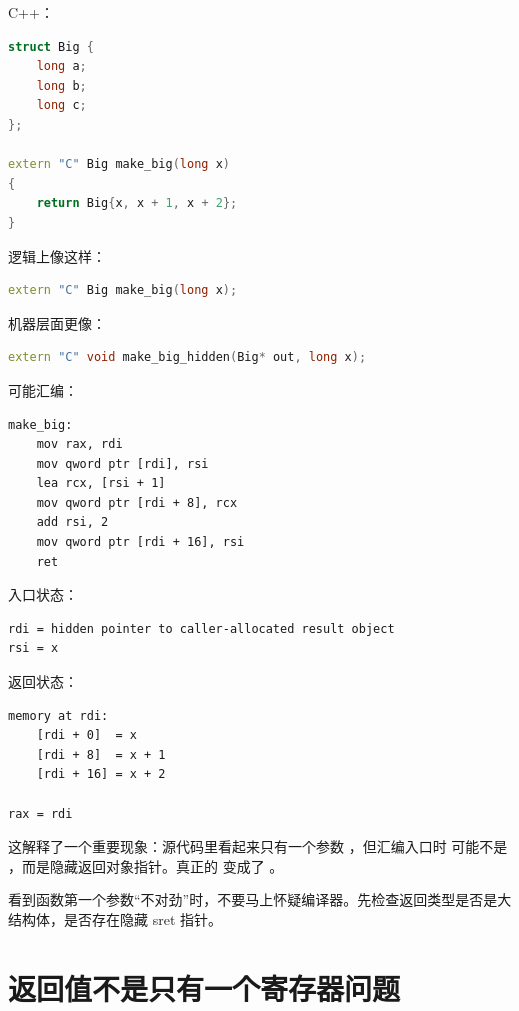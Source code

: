C++：

\begin{lstlisting}[language=C++]
struct Big {
    long a;
    long b;
    long c;
};

extern "C" Big make_big(long x)
{
    return Big{x, x + 1, x + 2};
}
\end{lstlisting}

逻辑上像这样：

\begin{lstlisting}[language=C++]
extern "C" Big make_big(long x);
\end{lstlisting}

机器层面更像：

\begin{lstlisting}[language=C++]
extern "C" void make_big_hidden(Big* out, long x);
\end{lstlisting}

可能汇编：

\begin{lstlisting}
make_big:
    mov rax, rdi
    mov qword ptr [rdi], rsi
    lea rcx, [rsi + 1]
    mov qword ptr [rdi + 8], rcx
    add rsi, 2
    mov qword ptr [rdi + 16], rsi
    ret
\end{lstlisting}

入口状态：

\begin{lstlisting}
rdi = hidden pointer to caller-allocated result object
rsi = x
\end{lstlisting}

返回状态：

\begin{lstlisting}
memory at rdi:
    [rdi + 0]  = x
    [rdi + 8]  = x + 1
    [rdi + 16] = x + 2

rax = rdi
\end{lstlisting}

这解释了一个重要现象：源代码里看起来只有一个参数 ，但汇编入口时  可能不是 ，而是隐藏返回对象指针。真正的  变成了 。

\begin{keyidea}
看到函数第一个参数“不对劲”时，不要马上怀疑编译器。先检查返回类型是否是大结构体，是否存在隐藏 sret 指针。
\end{keyidea}

\section{返回值不是只有一个寄存器问题}

